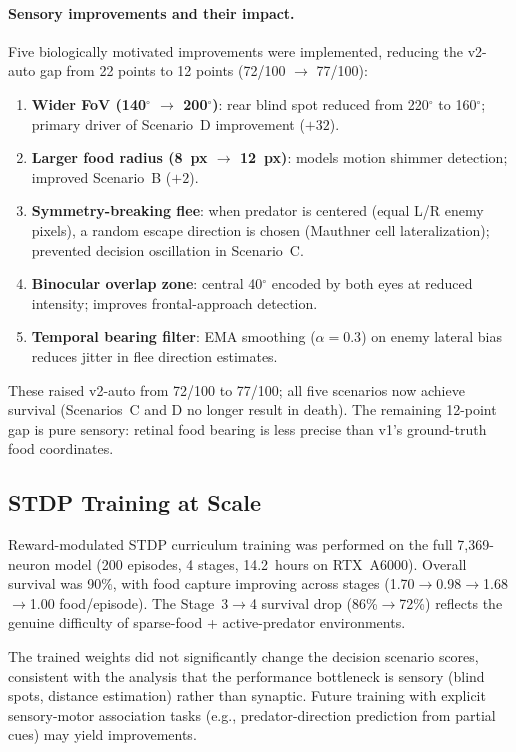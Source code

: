 \documentclass[11pt,a4paper]{article}
\begin{document}
\paragraph{Sensory improvements and their impact.}
Five biologically motivated improvements were implemented, reducing
the v2-auto gap from 22 points to 12 points (72/100 $\to$ 77/100):
\begin{enumerate}[nosep]
  \item \textbf{Wider FoV (140$^\circ$ $\to$ 200$^\circ$)}: rear
    blind spot reduced from 220$^\circ$ to 160$^\circ$; primary driver
    of Scenario~D improvement ($+32$).
  \item \textbf{Larger food radius (8~px $\to$ 12~px)}: models motion
    shimmer detection; improved Scenario~B ($+2$).
  \item \textbf{Symmetry-breaking flee}: when predator is centered
    (equal L/R enemy pixels), a random escape direction is chosen
    (Mauthner cell lateralization); prevented decision oscillation
    in Scenario~C.
  \item \textbf{Binocular overlap zone}: central 40$^\circ$ encoded
    by both eyes at reduced intensity; improves frontal-approach detection.
  \item \textbf{Temporal bearing filter}: EMA smoothing ($\alpha = 0.3$)
    on enemy lateral bias reduces jitter in flee direction estimates.
\end{enumerate}
These raised v2-auto from 72/100 to 77/100; all five scenarios now
achieve survival (Scenarios~C and D no longer result in death).
The remaining 12-point gap is pure sensory: retinal food bearing
is less precise than v1's ground-truth food coordinates.

\subsection{STDP Training at Scale}\label{sec:training_expected}

Reward-modulated STDP curriculum training was performed on the full
7,369-neuron model (200 episodes, 4 stages, 14.2~hours on RTX~A6000).
Overall survival was 90\%, with food capture improving across stages
(1.70$\to$0.98$\to$1.68$\to$1.00 food/episode).
The Stage~3$\to$4 survival drop (86\%$\to$72\%) reflects the genuine
difficulty of sparse-food + active-predator environments.

The trained weights did not significantly change the decision scenario
scores, consistent with the analysis that the performance bottleneck
is sensory (blind spots, distance estimation) rather than synaptic.
Future training with explicit sensory-motor association tasks (e.g.,
predator-direction prediction from partial cues) may yield improvements.
\end{document}
